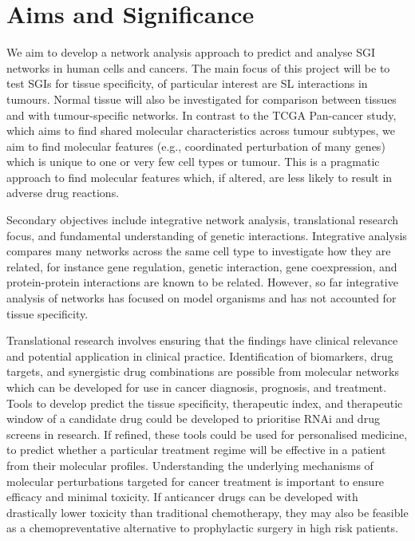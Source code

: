 \section{Aims and Significance}

We aim to develop a network analysis approach to predict and analyse SGI networks in human cells and cancers. The main focus of this project will be to test SGIs for tissue specificity, of particular interest are SL interactions in tumours. Normal tissue will also be investigated for comparison between tissues and with tumour-specific networks. In contrast to the TCGA Pan-cancer study, which aims to find shared molecular characteristics across tumour subtypes, we aim to find molecular features (e.g., coordinated perturbation of many genes) which is unique to one or very few cell types or tumour. This is a pragmatic approach to find molecular features which, if altered, are less likely to result in adverse drug reactions.

Secondary objectives include integrative network analysis, translational research focus, and fundamental understanding of genetic interactions. Integrative analysis compares many networks across the same cell type to investigate how they are related, for instance gene regulation, genetic interaction, gene coexpression, and protein-protein interactions are known to be related. However, so far integrative analysis of networks has focused on model organisms and has not accounted for tissue specificity.

Translational research involves ensuring that the findings have clinical relevance and potential application in clinical practice. Identification of biomarkers, drug targets, and synergistic drug combinations are possible from molecular networks which can be developed for use in cancer diagnosis, prognosis, and treatment. Tools to develop predict the tissue specificity, therapeutic index, and therapeutic window of a candidate drug could be developed to prioritise RNAi and drug screens in research. If refined, these tools could be used for personalised medicine, to predict whether a particular treatment regime will be effective in a patient from their molecular profiles. Understanding the underlying mechanisms of molecular perturbations targeted for cancer treatment is important to ensure efficacy and minimal toxicity. If anticancer drugs can be developed with drastically lower toxicity than traditional chemotherapy, they may also be feasible as a chemopreventative alternative to prophylactic surgery in high risk patients.

